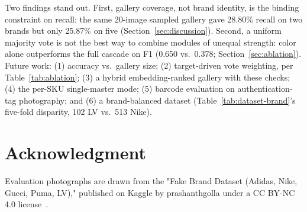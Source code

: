 \documentclass[conference]{IEEEtran}
\begin{document}
Two findings stand out. First, gallery coverage, not brand identity, is
the binding constraint on recall: the same 20-image sampled gallery gave
28.80\% recall on two brands but only 25.87\% on five
(Section~\ref{sec:discussion}). Second, a uniform majority vote is not
the best way to combine modules of unequal strength: color alone
outperforms the full cascade on F1 (0.650 vs.\ 0.378;
Section~\ref{sec:ablation}). Future work: (1) accuracy vs.\ gallery
size; (2) target-driven vote weighting, per Table~\ref{tab:ablation};
(3) a hybrid embedding-ranked gallery with these checks; (4) the
per-SKU single-master mode; (5) barcode evaluation on authentication-tag
photography; and (6) a brand-balanced dataset (Table~\ref{tab:dataset-brand}'s
five-fold disparity, 102 LV vs.\ 513 Nike).

\section*{Acknowledgment}
Evaluation photographs are drawn from the "Fake Brand Dataset
(Adidas, Nike, Gucci, Puma, LV)," published on Kaggle by prashanthgolla
under a CC BY-NC 4.0 license~\cite{kaggledata}.
\end{document}
